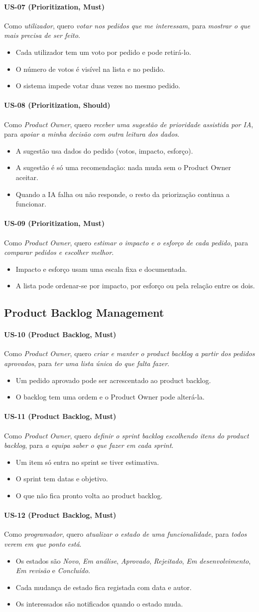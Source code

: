 \documentclass[12pt,a4paper]{article}
\newcommand{\us}[7]{%
  \paragraph{#1 \textnormal{(#2, #6)}}
  Como \textit{#3}, quero \textit{#4}, para \textit{#5}.
  \begin{itemize}
  #7
  \end{itemize}
}
\begin{document}
\us{US-07}{Prioritization}{utilizador}{votar nos pedidos que me interessam}{mostrar o que mais precisa de ser feito}{Must}{
\item Cada utilizador tem um voto por pedido e pode retirá-lo.
\item O número de votos é visível na lista e no pedido.
\item O sistema impede votar duas vezes no mesmo pedido.}

\us{US-08}{Prioritization}{Product Owner}{receber uma sugestão de prioridade assistida por IA}{apoiar a minha decisão com outra leitura dos dados}{Should}{
\item A sugestão usa dados do pedido (votos, impacto, esforço).
\item A sugestão é só uma recomendação: nada muda sem o Product Owner aceitar.
\item Quando a IA falha ou não responde, o resto da priorização continua a funcionar.}

\us{US-09}{Prioritization}{Product Owner}{estimar o impacto e o esforço de cada pedido}{comparar pedidos e escolher melhor}{Must}{
\item Impacto e esforço usam uma escala fixa e documentada.
\item A lista pode ordenar-se por impacto, por esforço ou pela relação entre os dois.}

\subsection{Product Backlog Management}

\us{US-10}{Product Backlog}{Product Owner}{criar e manter o product backlog a partir dos pedidos aprovados}{ter uma lista única do que falta fazer}{Must}{
\item Um pedido aprovado pode ser acrescentado ao product backlog.
\item O backlog tem uma ordem e o Product Owner pode alterá-la.}

\us{US-11}{Product Backlog}{Product Owner}{definir o sprint backlog escolhendo itens do product backlog}{a equipa saber o que fazer em cada sprint}{Must}{
\item Um item só entra no sprint se tiver estimativa.
\item O sprint tem datas e objetivo.
\item O que não fica pronto volta ao product backlog.}

\us{US-12}{Product Backlog}{programador}{atualizar o estado de uma funcionalidade}{todos verem em que ponto está}{Must}{
\item Os estados são \textit{Novo}, \textit{Em análise}, \textit{Aprovado}, \textit{Rejeitado}, \textit{Em desenvolvimento}, \textit{Em revisão} e \textit{Concluído}.
\item Cada mudança de estado fica registada com data e autor.
\item Os interessados são notificados quando o estado muda.}
\end{document}
